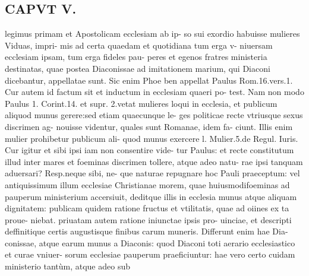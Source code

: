 \documentclass{article}
\begin{document}
\begin{pages}
\section*{CAPVT V. }
\marginpar{[ p.271 ]}\pstart legimus primam et Apostolicam ecclesiam ab ip- so sui exordio habuisse mulieres Viduas, impri- mis ad certa quaedam et quotidiana tum erga v- niuersam ecclesiam ipsam, tum erga fideles pau- peres et egenos fratres ministeria destinatas, quae postea Diaconissae ad imitationem marium, qui Diaconi dicebantur, appellatae sunt. Sic enim Phoe ben appellat Paulus Rom.16.vers.1. Cur autem id factum sit et inductum in ecclesiam quaeri po- test. Nam non modo Paulus 1. Corint.14. et supr. 2.vetat mulieres loqui in ecclesia, et publicum aliquod munus gerere:sed etiam quaecunque le- ges politicae recte vtriusque sexus discrimen ag- nouisse videntur, quales sunt Romanae, idem fa- ciunt. Illis enim mulier prohibetur publicum ali- quod munus exercere l. Mulier.5.de Regul. Iuris. Cur igitur et sibi ipsi iam non consentire vide- tur Paulus: et recte constitutum illud inter mares et foeminas discrimen tollere, atque adeo natu- rae ipsi tanquam aduersari? Resp.neque sibi, ne- que naturae repugnare hoc Pauli praeceptum: vel antiquissimum illum ecclesiae Christianae morem, quae huiusmodifoeminas ad pauperum ministerium accersiuit, deditque illis in ecclesia munus atque aliquam dignitatem: publicam quidem ratione fructus et vtilitatis, quae ad oiines ex ta proue- niebat. priuatam autem ratione iniunctae ipsis pro- uinciae, et descripti deffinitique  certis augustisque finibus carum muneris. Differunt enim hae Dia- conissae, atque earum munus a Diaconis: quod Diaconi toti aerario ecclesiastico et curae vniuer- sorum ecclesiae pauperum praeficiuntur: hae vero certo cuidam ministerio tantùm, atque adeo sub  \pend

\end{pages}
\end{document}
